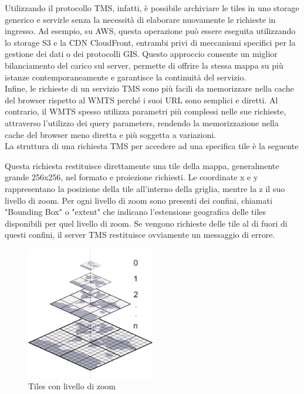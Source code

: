 Utilizzando il protocollo TMS, infatti, è possibile archiviare le tiles in uno storage generico e servirle senza la necessità di elaborare nuovamente le richieste in ingresso. Ad esempio, su AWS, questa operazione può essere eseguita utilizzando lo storage S3 e la CDN CloudFront, entrambi privi di meccanismi specifici per la gestione dei dati o dei protocolli GIS. Questo approccio consente un miglior bilanciamento del carico sul server, permette di offrire la stessa mappa su più istanze contemporaneamente e garantisce la continuità del servizio.
\\Infine, le richieste di un servizio TMS sono più facili da memorizzare nella cache del browser rispetto al WMTS perché i suoi URL sono semplici e diretti. Al contrario, il WMTS spesso utilizza parametri più complessi nelle sue richieste, attraverso l'utilizzo dei query parameters, rendendo la memorizzazione nella cache del browser meno diretta e più soggetta a variazioni.
\\La struttura di una richiesta TMS per accedere ad una specifica tile è la seguente

Questa richiesta restituisce direttamente una tile della mappa, generalmente grande 256x256, nel formato e proiezione richiesti. Le coordinate x e y rappresentano la posizione della tile all'interno della griglia, mentre la z il suo livello di zoom. Per ogni livello di zoom sono presenti dei confini, chiamati "Bounding Box" o "extent" che indicano l'estensione geografica delle tiles disponibili per quel livello di zoom. Se vengono richieste delle tile al di fuori di questi confini, il server TMS restituisce ovviamente un messaggio di errore.
\begin{figure}[htbp]
      \centering
      \includegraphics[width=0.5\textwidth]{images/Capitolo2/tilesPyramid.jpg}
      \caption{Tiles con livello di zoom}
      \label{fig:tmsTiles}
\end{figure}


